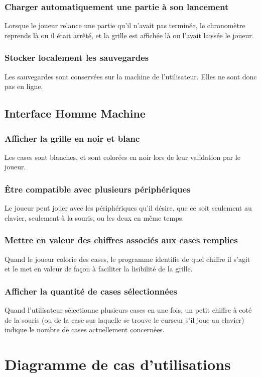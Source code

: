\documentclass{report}
\begin{document}
		\subsubsection{Charger automatiquement une partie à son lancement}
			Lorsque le joueur relance une partie qu'il n'avait pas terminée, le chronomètre reprends là ou il était arrêté, et la grille est affichée là ou l'avait laissée le joueur.
		\subsubsection{Stocker localement les sauvegardes}
			Les sauvegardes sont conservées sur la machine de l'utilisateur. Elles ne sont donc pas en ligne.
			
	\subsection{Interface Homme Machine}
		\subsubsection{Afficher la grille en noir et blanc}
			Les cases sont blanches, et sont colorées en noir lors de leur validation par le joueur.
		\subsubsection{Être compatible avec plusieurs périphériques}
			Le joueur peut jouer avec les périphériques qu'il désire, que ce soit seulement au clavier, seulement à la souris, ou les deux en même temps.
		\subsubsection{Mettre en valeur des chiffres associés aux cases remplies}
			Quand le joueur colorie des cases, le programme identifie de quel chiffre il s'agit et le met en valeur de façon à faciliter la lisibilité de la grille.
		\subsubsection{Afficher la quantité de cases sélectionnées}
			Quand l'utilisateur sélectionne plusieurs cases en une fois, un petit chiffre à coté de la souris (ou de la case sur laquelle se trouve le curseur s'il joue au clavier) indique le nombre de cases actuellement concernées.
		
   \section{Diagramme de cas d'utilisations}
      
\end{document}
